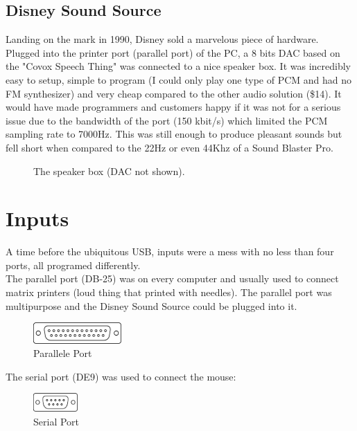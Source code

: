 \documentclass[book.tex]{subfiles}
\begin{document}
  \subsection{Disney Sound Source}
  Landing on the mark in 1990, Disney sold a marvelous piece of hardware. Plugged into the printer port (parallel port) of the PC, a 8 bits DAC based on the "Covox Speech Thing" was connected to a nice speaker box. It was incredibly easy to setup, simple to program (I could only play one type of PCM and had no FM synthesizer) and very cheap compared to the other audio solution (\$14). It would have made programmers and customers happy if it was not for a serious issue due to the bandwidth of the port (150 kbit/s) which limited the PCM sampling rate to 7000Hz.  This was still enough to produce pleasant sounds but fell short when compared to the 22Hz or even 44Khz of a Sound Blaster Pro.
  \par
  \begin{figure}[H] 
    \centering 
    \caption{The speaker box (DAC not shown).}
  \end{figure}








\section{Inputs}
A time before the ubiquitous USB, inputs were a mess with no less than four ports, all programed differently.\\

The parallel port (DB-25) was on every computer and usually used to connect matrix printers (loud thing that printed with needles). The parallel port was multipurpose and the Disney Sound Source could be plugged into it.\\
\par
 \begin{figure}[H]
\centering
\includegraphics[width=0.3\textwidth]{imgs/drawings/ports/DB-25_parallel_port.eps}
\caption{Parallele Port}
\label{fig:parallelPort}
\end{figure}


The serial port (DE9) was used to connect the mouse:
 \begin{figure}[H]
\centering
\includegraphics[width=0.15\textwidth]{imgs/drawings/ports/DE9_serial_port.eps}
\caption{Serial Port}
\label{fig:serialPort}
\end{figure}
\end{document}

